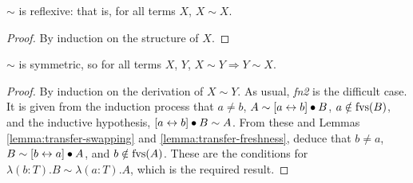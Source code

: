 \begin{lemma}
\(\sim\) is reflexive: that is, for all terms \(X\), \(X \sim X\).
\end{lemma}
\begin{proof}
By induction on the structure of \(X\).
\end{proof}

\begin{lemma}
\(\sim\) is symmetric, so for all terms \(X\), \(Y\), \(X \sim Y \Longrightarrow Y \sim X\).
\end{lemma}
\begin{proof}
By induction on the derivation of \(X \sim Y\).
As usual, \emph{fn2} is the difficult case.
It is given from the induction process that \(a \neq b\), \(A \sim [a \leftrightarrow b] \bullet B\), \(a \notin \mathrm{fvs}(B)\), and the inductive hypothesis, \([a \leftrightarrow b] \bullet B \sim A\).
From these and Lemmas \ref{lemma:transfer-swapping} and \ref{lemma:transfer-freshness}, deduce that \(b \neq a\), \(B \sim [b \leftrightarrow a] \bullet A\), and \(b \notin \mathrm{fvs}(A)\).
These are the conditions for \(\lambda (b:T).B \sim \lambda (a:T).A\), which is the required result.
\end{proof}

